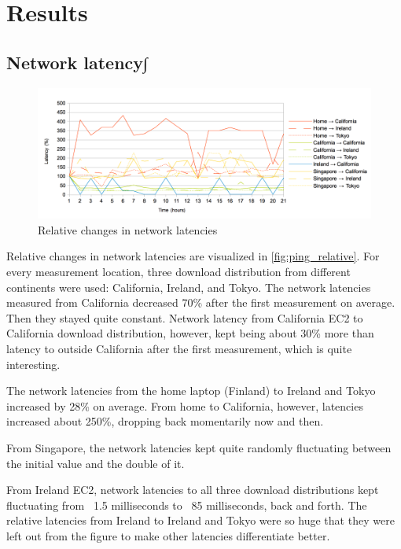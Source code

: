 \documentclass[conference]{IEEEtran}
\begin{document}
\section{Results}

\subsection{Network latency∫}

\begin{figure}[h]
    \centering
    \includegraphics[width=7in]{images/pings_relative.png}
    \caption[]{Relative changes in network latencies}
    \label{fig:ping_relative}
\end{figure}

Relative changes in network latencies are visualized in \autoref{fig:ping_relative}. For every measurement location, three download distribution from different continents were used: California, Ireland, and Tokyo. The network latencies measured from California decreased 70\% after the first measurement on average. Then they stayed quite constant. Network latency from California EC2 to California download distribution, however, kept being about 30\% more than latency to outside California after the first measurement, which is quite interesting.

The network latencies from the home laptop (Finland) to Ireland and Tokyo increased by 28\% on average. From home to California, however, latencies increased about 250\%, dropping back momentarily now and then.

From Singapore, the network latencies kept quite randomly fluctuating between the initial value and the double of it.

From Ireland EC2, network latencies to all three download distributions kept fluctuating from ~1.5 milliseconds to ~85 milliseconds, back and forth. The relative latencies from Ireland to Ireland and Tokyo were so huge that they were left out from the figure to make other latencies differentiate better.\\
\end{document}

